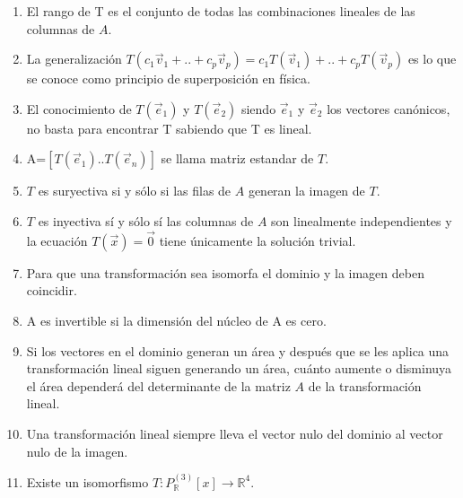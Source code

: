 \begin{enumerate}

\item

El rango de T es el conjunto de todas las combinaciones lineales de las columnas de $A$.

\item

La generalización $T(c_1\vec{v}_1 + .. + c_p\vec{v}_p) = c_1 T(\vec{v}_1)+ .. + c_p T(\vec{v}_p)  $ es lo que se conoce como principio de superposición en física.

\item

El conocimiento de $T(\vec{e}_1)$ y $T(\vec{e}_2)$ siendo $\vec{e}_1$ y $\vec{e}_2$ los vectores canónicos, no basta para encontrar T sabiendo que T es lineal.

\item

A=$ [ T(\vec{e}_1) .. T(\vec{e}_n)]$ se llama matriz estandar de $T$.

\item

$T$ es suryectiva si y sólo si las filas de $A$ generan la imagen de $T$. 

\item

$T$ es inyectiva sí y sólo sí las columnas de $A$ son linealmente independientes y la ecuación $T(\vec{x})= \vec{0}$
tiene únicamente la solución trivial.

\item

Para que una transformación sea isomorfa el dominio y la imagen deben coincidir.

\item

A es invertible si la dimensión del núcleo de A es cero.

\item

Si los vectores en el dominio generan un área y después que se les aplica una transformación lineal  siguen generando un área, cuánto aumente o disminuya el área dependerá
del determinante de la matriz $A$ de la transformación lineal.

\item
Una transformación lineal siempre lleva el vector nulo del dominio al vector nulo de la imagen.

\item

Existe un isomorfismo $T:P^{(3)}_{\mathbb{R}}[x] \rightarrow \mathbb{R}^4$.




\end{enumerate}





